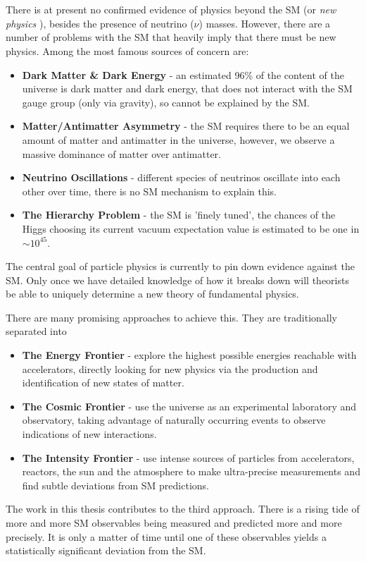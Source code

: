 \\ \\
There is at present no confirmed evidence of physics beyond the SM (or {\it{new physics}} ), besides the presence of neutrino ($\nu$) masses. However, there are a number of problems with the SM that heavily imply that there must be new physics. Among the most famous sources of concern are:
\begin{itemize}
\item
  {\bf{Dark Matter \& Dark Energy}} - an estimated 96\% of the content of the universe is dark matter and dark energy, that does not interact with the SM gauge group (only via gravity), so cannot be explained by the SM.
\item
  {\bf{Matter/Antimatter Asymmetry}} - the SM requires there to be an equal amount of matter and antimatter in the universe, however, we observe a massive dominance of matter over antimatter.
\item
  {\bf{Neutrino Oscillations}} - different species of neutrinos oscillate into each other over time, there is no SM mechanism to explain this.
\item
  {\bf{The Hierarchy Problem}} - the SM is 'finely tuned', the chances of the Higgs choosing its current vacuum expectation value is estimated to be one in $\sim 10^{45}$.
\end{itemize}

The central goal of particle physics is currently to pin down evidence against the SM. Only once we have detailed knowledge of how it breaks down will theorists be able to uniquely determine a new theory of fundamental physics.

There are many promising approaches to achieve this. They are traditionally separated into
\begin{itemize}
\item
  {\bf{The Energy Frontier}} - explore the highest possible energies reachable with accelerators, directly looking for new physics via the production and identification of new states of matter.
\item
  {\bf{The Cosmic Frontier}} - use the universe as an experimental laboratory and observatory,  taking advantage of naturally occurring events to observe indications of new interactions.
\item
  {\bf{The Intensity Frontier}} - use intense sources of particles from accelerators, reactors, the sun and the atmosphere to make ultra-precise measurements and find subtle deviations from SM predictions.
\end{itemize}
The work in this thesis contributes to the third approach. There is a rising tide of more and more SM observables being measured and predicted more and more precisely. It is only a matter of time until one of these observables yields a statistically significant deviation from the SM.

